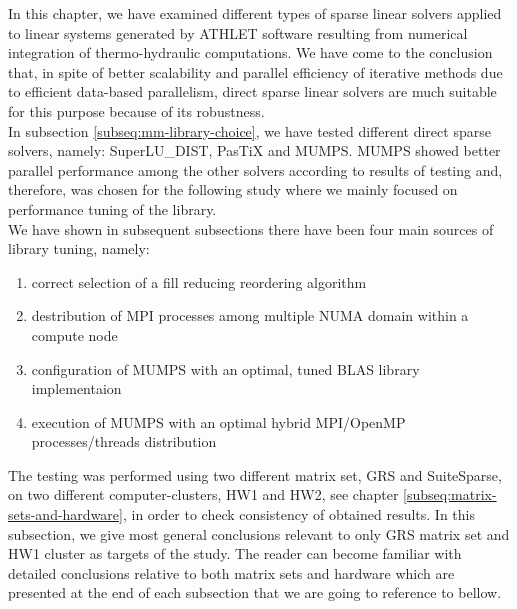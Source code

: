 \label{subseq:mm-conclusion}

In this chapter, we have examined different types of sparse linear solvers applied to linear systems generated by ATHLET software resulting from numerical integration of thermo-hydraulic computations. We have come to the conclusion that, in spite of better scalability and parallel efficiency of iterative methods due to efficient data-based parallelism, direct sparse linear solvers are much suitable for this purpose because of its robustness.\\


In subsection \ref{subseq:mm-library-choice}, we have tested different direct sparse solvers, namely: SuperLU\_DIST, PasTiX and MUMPS. MUMPS showed better parallel performance among the other solvers according to results of testing and, therefore, was chosen for the following study where we mainly focused on performance tuning of the library.\\


We have shown in subsequent subsections there have been four main sources of library tuning, namely:

\begin{enumerate}
	\item correct selection of a fill reducing reordering algorithm \label{conclusion:mm-1}
	\item destribution of MPI processes among multiple NUMA domain within a compute node \label{conclusion:mm-2}
	\item configuration of MUMPS with an optimal, tuned BLAS library implementaion \label{conclusion:mm-3}
	\item execution of MUMPS with an optimal hybrid MPI/OpenMP processes/threads distribution \label{conclusion:mm-4}
\end{enumerate}


The testing was performed using two different matrix set, GRS and SuiteSparse, on two different computer-clusters, HW1 and HW2, see chapter \ref{subseq:matrix-sets-and-hardware}, in order to check consistency of obtained results. In this subsection, we  give most general conclusions relevant to only GRS matrix set and HW1 cluster as targets of the study. The reader can become familiar with detailed conclusions relative to both matrix sets and hardware which are presented at the end of each subsection that we are going to reference to bellow.\\



